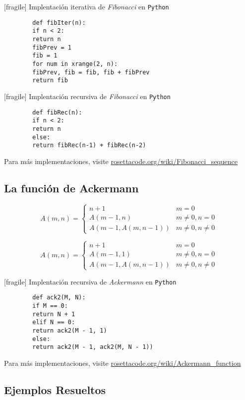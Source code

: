 [fragile]
	{Implentaci\'on iterativa de \emph{Fibonacci} en \texttt{Python}}
	\begin{verbatim}
		def fibIter(n):
		if n < 2:
		return n
		fibPrev = 1
		fib = 1
		for num in xrange(2, n):
		fibPrev, fib = fib, fib + fibPrev
		return fib
	\end{verbatim} 


[fragile]
	{Implentaci\'on recursiva de \emph{Fibonacci} en \texttt{Python}}
	\begin{verbatim}
		def fibRec(n):
		if n < 2:
		return n
		else:
		return fibRec(n-1) + fibRec(n-2)
	\end{verbatim}
	Para m\'as implementaciones, visite \href{http://rosettacode.org/wiki/Fibonacci\_sequence}{rosettacode.org/wiki/Fibonacci\_sequence}


\subsection{La funci\'on de Ackermann}


	\begin{defn}
		$$
		A(m,n)=
		\begin{cases}
			n+1 & m=0\\
			A(m-1,n) & m\neq0, n=0 \\
			A(m-1, A(m,n-1)) & m\neq 0, n\neq 0
		\end{cases}
		$$
	\end{defn}
	



	\begin{defn}
		$$
		A(m,n)=
		\begin{cases}
			n+1 & m=0\\
			A(m-1,1) & m\neq0, n=0 \\
			A(m-1, A(m,n-1)) & m\neq 0, n\neq 0
		\end{cases}
		$$
	\end{defn}
	


[fragile]
	{Implentaci\'on recursiva de \emph{Ackermann} en \texttt{Python}}
	\begin{verbatim}
		def ack2(M, N):
		if M == 0:
		return N + 1
		elif N == 0:
		return ack2(M - 1, 1)
		else:
		return ack2(M - 1, ack2(M, N - 1))
	\end{verbatim}
	Para m\'as implementaciones, visite \href{http://rosettacode.org/wiki/Ackermann\_function}{rosettacode.org/wiki/Ackermann\_function}


\subsection{Ejemplos Resueltos}


